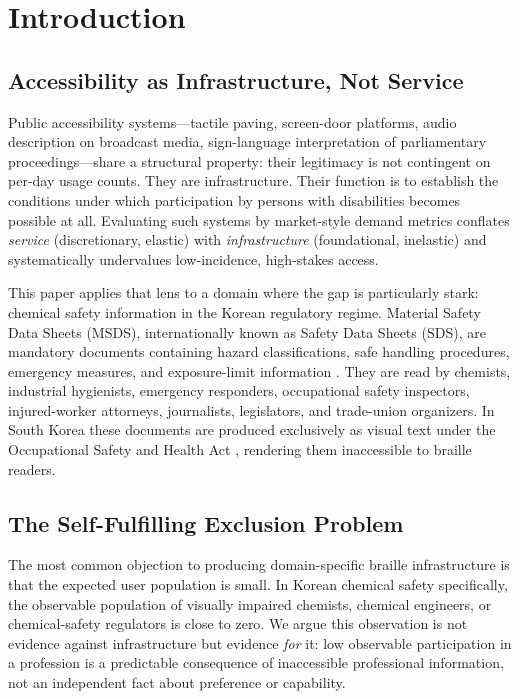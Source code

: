\documentclass[journal]{IEEEtran}
\begin{document}
\maketitle

\section{Introduction}
\label{sec:introduction}

\subsection{Accessibility as Infrastructure, Not Service}

Public accessibility systems---tactile paving, screen-door platforms, audio description on broadcast media, sign-language interpretation of parliamentary proceedings---share a structural property: their legitimacy is not contingent on per-day usage counts. They are infrastructure. Their function is to establish the conditions under which participation by persons with disabilities becomes possible at all. Evaluating such systems by market-style demand metrics conflates \emph{service} (discretionary, elastic) with \emph{infrastructure} (foundational, inelastic) and systematically undervalues low-incidence, high-stakes access.

This paper applies that lens to a domain where the gap is particularly stark: chemical safety information in the Korean regulatory regime. Material Safety Data Sheets (MSDS), internationally known as Safety Data Sheets (SDS), are mandatory documents containing hazard classifications, safe handling procedures, emergency measures, and exposure-limit information \cite{kosha_act}. They are read by chemists, industrial hygienists, emergency responders, occupational safety inspectors, injured-worker attorneys, journalists, legislators, and trade-union organizers. In South Korea these documents are produced exclusively as visual text under the Occupational Safety and Health Act \cite{kosha_act}, rendering them inaccessible to braille readers.

\subsection{The Self-Fulfilling Exclusion Problem}

The most common objection to producing domain-specific braille infrastructure is that the expected user population is small. In Korean chemical safety specifically, the observable population of visually impaired chemists, chemical engineers, or chemical-safety regulators is close to zero. We argue this observation is not evidence against infrastructure but evidence \emph{for} it: low observable participation in a profession is a predictable consequence of inaccessible professional information, not an independent fact about preference or capability.
\end{document}
